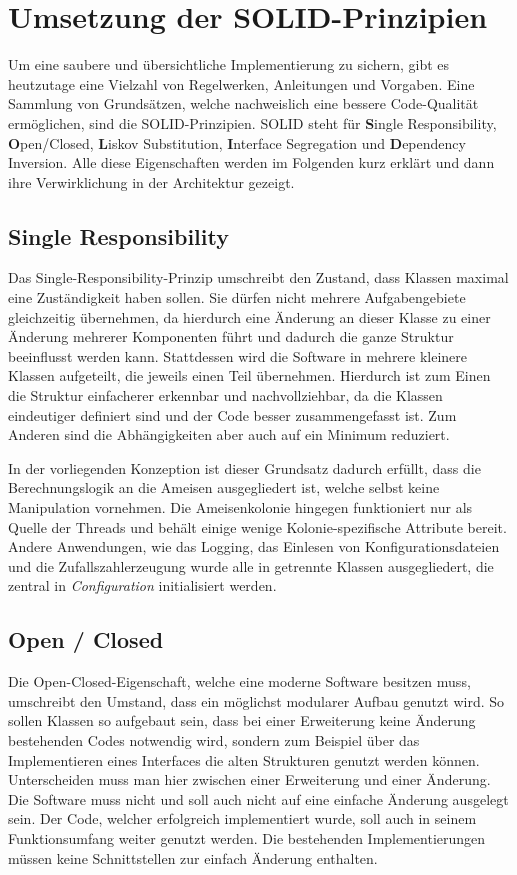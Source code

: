 \section{Umsetzung der SOLID-Prinzipien}{
	Um eine saubere und übersichtliche Implementierung zu sichern, gibt es heutzutage eine Vielzahl von Regelwerken, Anleitungen und Vorgaben. Eine Sammlung von Grundsätzen, welche nachweislich eine bessere Code-Qualität ermöglichen, sind die SOLID-Prinzipien. SOLID steht für \textbf{S}ingle Responsibility, \textbf{O}pen/Closed, \textbf{L}iskov Substitution, \textbf{I}nterface Segregation und \textbf{D}ependency Inversion.
	Alle diese Eigenschaften werden im Folgenden kurz erklärt und dann ihre Verwirklichung in der Architektur gezeigt.
	
	\subsection{Single Responsibility}
	Das Single-Responsibility-Prinzip umschreibt den Zustand, dass Klassen maximal eine Zuständigkeit haben sollen. Sie dürfen nicht mehrere Aufgabengebiete gleichzeitig übernehmen, da hierdurch eine Änderung an dieser Klasse zu einer Änderung mehrerer Komponenten führt und dadurch die ganze Struktur beeinflusst werden kann.
	Stattdessen wird die Software in mehrere kleinere Klassen aufgeteilt, die jeweils einen Teil übernehmen. Hierdurch ist zum Einen die Struktur einfacherer erkennbar und nachvollziehbar, da die Klassen eindeutiger definiert sind und der Code besser zusammengefasst ist. Zum Anderen sind die Abhängigkeiten aber auch auf ein Minimum reduziert.
	
	In der vorliegenden Konzeption ist dieser Grundsatz dadurch erfüllt, dass die Berechnungslogik an die Ameisen ausgegliedert ist, welche selbst keine Manipulation vornehmen. Die Ameisenkolonie hingegen funktioniert nur als Quelle der Threads und behält einige wenige Kolonie-spezifische Attribute bereit.
	Andere Anwendungen, wie das Logging, das Einlesen von Konfigurationsdateien und die Zufallszahlerzeugung wurde alle in getrennte Klassen ausgegliedert, die zentral in \textit{Configuration} initialisiert werden.
	
	\subsection{Open / Closed}
	Die Open-Closed-Eigenschaft, welche eine moderne Software besitzen muss, umschreibt den Umstand, dass ein möglichst modularer Aufbau genutzt wird. So sollen Klassen so aufgebaut sein, dass bei einer Erweiterung keine Änderung bestehenden Codes notwendig wird, sondern zum Beispiel über das Implementieren eines Interfaces die alten Strukturen genutzt werden können.
	Unterscheiden muss man hier zwischen einer Erweiterung und einer Änderung. Die Software muss nicht und soll auch nicht auf eine einfache Änderung ausgelegt sein. Der Code, welcher erfolgreich implementiert wurde, soll auch in seinem Funktionsumfang weiter genutzt werden. Die bestehenden Implementierungen müssen keine Schnittstellen zur einfach Änderung enthalten.
	
}
